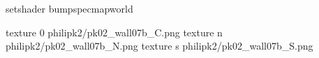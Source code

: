 setshader bumpspecmapworld

texture 0 philipk2/pk02_wall07b_C.png
texture n philipk2/pk02_wall07b_N.png
texture s philipk2/pk02_wall07b_S.png

